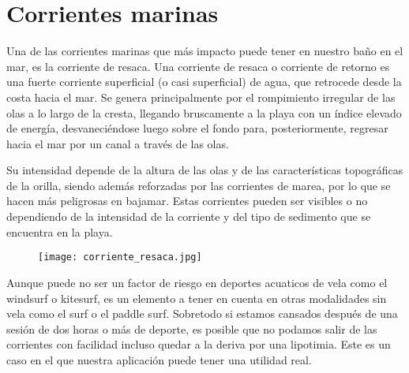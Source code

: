 \section{Corrientes marinas}

Una de las corrientes marinas que más impacto puede tener en nuestro baño en el mar, es la corriente de resaca. \cite{RESACA}
Una corriente de resaca o corriente de retorno es una fuerte corriente superficial (o casi superficial) de agua, que retrocede desde la costa hacia el mar. Se genera principalmente por el rompimiento irregular de las olas a lo largo de la cresta, llegando bruscamente a la playa con un índice elevado de energía, desvaneciéndose luego sobre el fondo para, posteriormente, regresar hacia el mar por un canal a través de las olas.

Su intensidad depende de la altura de las olas y de las características topográficas de la orilla, siendo además reforzadas por las corrientes de marea, por lo que se hacen más peligrosas en bajamar. Estas corrientes pueden ser visibles o no dependiendo de la intensidad de la corriente y del tipo de sedimento que se encuentra en la playa.

\begin{figure}[hb]
\texttt{[image: corriente\_resaca.jpg]} 
\end{figure}

Aunque puede no ser un factor de riesgo en deportes acuaticos de vela como el windsurf o kitesurf, es un elemento a tener en cuenta en otras modalidades sin vela como el surf o el paddle surf. Sobretodo si estamos cansados después de una sesión de dos horas o más de deporte, es posible que no podamos salir de las corrientes con facilidad incluso quedar a la deriva por una lipotimia. Este es un caso en el que nuestra aplicación puede tener una utilidad real.
